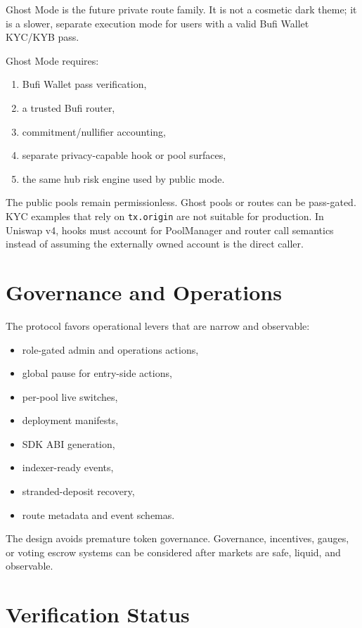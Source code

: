 \documentclass[11pt]{article}
\begin{document}
Ghost Mode is the future private route family. It is not a cosmetic dark theme;
it is a slower, separate execution mode for users with a valid Bufi Wallet
KYC/KYB pass.

Ghost Mode requires:

\begin{enumerate}
  \item Bufi Wallet pass verification,
  \item a trusted Bufi router,
  \item commitment/nullifier accounting,
  \item separate privacy-capable hook or pool surfaces,
  \item the same hub risk engine used by public mode.
\end{enumerate}

The public pools remain permissionless. Ghost pools or routes can be
pass-gated. KYC examples that rely on \texttt{tx.origin} are not suitable for
production. In Uniswap v4, hooks must account for PoolManager and router call
semantics instead of assuming the externally owned account is the direct caller.

\section{Governance and Operations}

The protocol favors operational levers that are narrow and observable:

\begin{itemize}
  \item role-gated admin and operations actions,
  \item global pause for entry-side actions,
  \item per-pool live switches,
  \item deployment manifests,
  \item SDK ABI generation,
  \item indexer-ready events,
  \item stranded-deposit recovery,
  \item route metadata and event schemas.
\end{itemize}

The design avoids premature token governance. Governance, incentives, gauges,
or voting escrow systems can be considered after markets are safe, liquid, and
observable.

\section{Verification Status}
\end{document}

